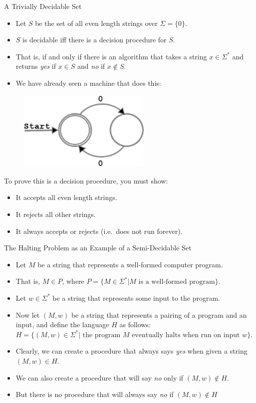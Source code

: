 \documentclass[style=sailor,size=12pt]{powerdot}
\begin{document}
\begin{wideslide}[bm=,toc=]{A Trivially Decidable Set}
\begin{itemize}
\item Let $S$ be the set of all even length strings over $\Sigma = \{0\}$. 
\item $S$ is decidable iff there is a decision procedure for $S$.
\item That is, if and only if there is an algorithm that takes a string $x \in
\Sigma^*$ and returns \emph{yes} if $x \in S$ and \emph{no} if $x \notin S$.
\item We have already seen a machine that does this: 
\end{itemize}
\begin{figure}[h]
\centering
\includegraphics[width=2.5in, height=.75in,keepaspectratio=true]{evenzeroautomata.eps}
\label{2sp}
\end{figure}
To prove this is a decision procedure, you must show:
\begin{itemize}
\item It accepts all even length strings. 
\item It rejects all other strings. 
\item It always accepts or rejects (i.e.\ does not run forever).
\end{itemize}
\end{wideslide}

\begin{wideslide}[bm=,toc=]{The Halting Problem as an Example of a Semi-Decidable Set}
\begin{itemize}
\item Let $M$ be a string that represents a well-formed computer program.
\item That is, $M \in P$, where $P = \{M \in \Sigma^* | M \text{ is a well-formed 
  program}\}$.
\item Let $w \in \Sigma^*$ be a string that represents some input to the program.
\item Now let $(M,w)$ be a string that represents a pairing of a program and an
input, and define the language $H$ as follows:\\ 
$H = \{(M,w) \in \Sigma^* | \text{ the program } M
\text{ eventually halts when run on input } w\}$.
\item Clearly, we can create a procedure that always says \emph{yes} when given a
string $(M,w) \in H$. 
\item We can also create a procedure that will say \emph{no} only if $(M,w) \notin H$.
\item But there is no procedure that will always say \emph{no} if $(M,w) \notin H$
\end{itemize}
\end{wideslide}
\end{document}
